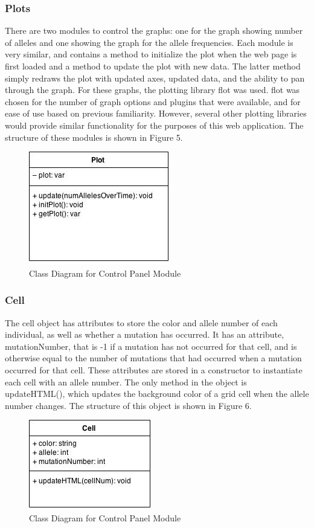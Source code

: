 \documentclass[12pt]{article}
\begin{document}
\begin{spacing}{1.6}
\subsubsection{Plots}
There are two modules to control the graphs: one for the graph showing number of alleles and one showing the graph for the allele frequencies. Each module is very similar, and contains a method to initialize the plot when the web page is first loaded and a method to update the plot with new data. The latter method simply redraws the plot with updated axes, updated data, and the ability to pan through the graph. For these graphs, the plotting library flot \cite{flot} was used. flot was chosen for the number of graph options and plugins that were available, and for ease of use based on previous familiarity. However, several other plotting libraries would provide similar functionality for the purposes of this web application. The structure of these modules is shown in Figure 5.
\begin{figure}[h]
\caption{Class Diagram for Control Panel Module}
\centering
\includegraphics[scale=0.5]{plot-class-diagram}
\end{figure}

\subsubsection{Cell}
The cell object has attributes to store the color and allele number of each individual, as well as whether a mutation has occurred. It has an attribute, mutationNumber, that is -1 if a mutation has not occurred for that cell, and is otherwise equal to the number of mutations that had occurred when a mutation occurred for that cell. These attributes are stored in a constructor to instantiate each cell with an allele number. The only method in the object is updateHTML(), which updates the background color of a grid cell when the allele number changes. The structure of this object is shown in Figure 6.
\begin{figure}[h]
\caption{Class Diagram for Control Panel Module}
\centering
\includegraphics[scale=0.5]{cell-class-diagram}
\end{figure}


\end{spacing}
\end{document}
